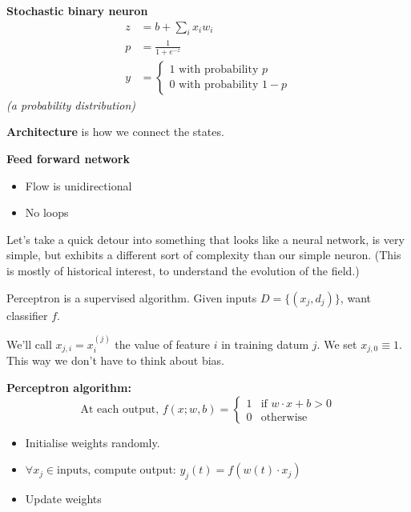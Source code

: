 \bigskip
\textbf{Stochastic binary neuron}
\begin{align*}
  z & = b + \sum_i x_i w_i \\[2mm]
  p &= \frac{1}{1+e^{-z}} \\[3mm]
  y & = \left\{
      \begin{array}{l}
        1  \text{ with probability } p \\[2mm]
        0  \text{ with probability } 1 - p
      \end{array}
  \right.
\end{align*}
\textit{(a probability distribution)}





\textbf{Architecture} is how we connect the states.

\textbf{Feed forward network}
\begin{itemize}
\item Flow is unidirectional
\item No loops
\end{itemize}



Let's take a quick detour into something that looks like a neural
network, is very simple, but exhibits a different sort of complexity
than our simple neuron.  (This is mostly of historical interest, to
understand the evolution of the field.)

Perceptron is a supervised algorithm.  Given inputs
$D = \{(x_j, d_j)\}$, want classifier $f$.

We'll call $x_{j,i} = x^{(j)}_i$ the value of feature $i$ in training datum $j$.
We set $x_{j,0}\equiv 1$.  This way we don't have to think about bias.

\textbf{Perceptron algorithm:}
\begin{displaymath}
  \mbox{At each output, }
  f(x; w, b) = \left\{
    \begin{array}{ll}
      1 & \mbox{if } w\cdot x + b > 0 \\
      0 & \mbox{otherwise}
    \end{array}
 \right.
\end{displaymath}
\begin{itemize}
\item Initialise weights randomly.
\item $\forall x_j\in \mbox{inputs}$, compute output: $y_j(t) = f(w(t)\cdot x_j)$
\item Update weights
\end{itemize}

